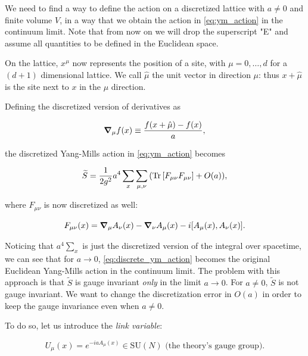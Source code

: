 \documentclass[reqno,12pt]{article}
\numberwithin{equation}{section}
\newcommand{\SU}{\mathrm{SU}}
\begin{document}
We need to find a way to define the action on a discretized lattice with $a \ne 0$ and finite volume $V$, 
in a way that we obtain the action in \eqref{eq:ym_action} in the continuum limit. Note that from now on we will drop the
superscript "E" and assume all quantities to be defined in the Euclidean space. 

On the lattice, $x^\mu$ now represents the position of a site, with $\mu = 0, \dots, d$ for a $(d+1)$ dimensional lattice.
We call $\hat{\mu}$ the unit vector in direction $\mu$: thus $x + \hat{\mu}$ is the site next to $x$ in the $\mu$ direction.  

Defining the discretized version of derivatives as

\begin{equation} \label{eq:discrete_derivative}
	\grad_\mu f(x) \equiv \frac{f(x + \hat\mu) - f(x)}{a},
\end{equation}

the discretized Yang-Mills action in \eqref{eq:ym_action} becomes

\begin{equation} \label{eq:discrete_ym_action}
	\widetilde{S} = \frac{1}{2g^2} a^4 \sum_x \sum_{\mu,\nu} \qty(\Tr\qty[F_{\mu\nu}F_{\mu\nu}] + O(a)),
\end{equation}

where $F_{\mu\nu}$ is now discretized as well:

\begin{equation} \label{eq:discrete_Fmunu}
	F_{\mu\nu}(x) = \grad_\mu A_\nu(x) - \grad_\nu A_\mu(x) - i\qty[A_\mu(x), A_\nu(x)].
\end{equation}

Noticing that $a^4 \sum_x$ is just the discretized version of the integral over spacetime, we can see that for
$a \rightarrow 0$, \eqref{eq:discrete_ym_action} becomes the original Euclidean Yang-Mills action in the continuum limit.
The problem with this approach is that $\widetilde{S}$ is gauge invariant \textit{only} in the limit $a \rightarrow 0$. For
$a \ne 0$, $\widetilde{S}$ is not gauge invariant. We want to change the discretization error in $O(a)$ in order to keep the 
gauge invariance even when $a \ne 0$.

To do so, let us introduce the \textit{link variable}:

\begin{equation} \label{eq:link}
	U_\mu(x) = e^{-iaA_\mu(x)} \in \SU(N) \text{ (the theory's gauge group)}.
\end{equation}
\end{document}
